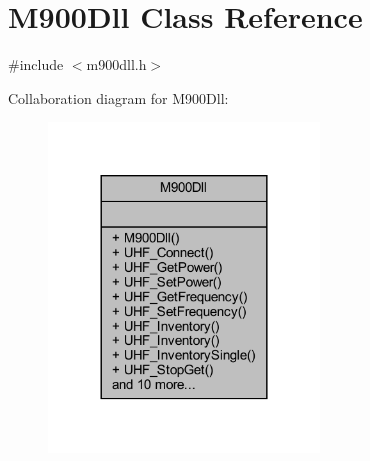 \hypertarget{class_m900_dll}{}\section{M900\+Dll Class Reference}
\label{class_m900_dll}


{\ttfamily \#include $<$m900dll.\+h$>$}



Collaboration diagram for M900\+Dll\+:
\nopagebreak
\begin{figure}[H]
\begin{center}
\leavevmode
\includegraphics[width=204pt]{class_m900_dll__coll__graph}
\end{center}
\end{figure}
